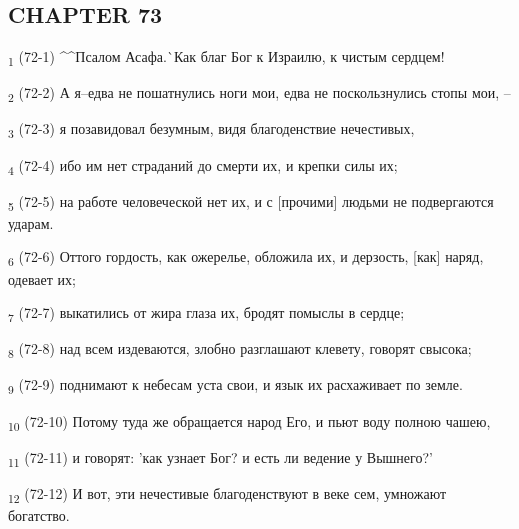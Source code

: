 \subsection{CHAPTER 73}
\begin{tcolorbox}
\textsubscript{1} (72-1) ^^Псалом Асафа.^^ Как благ Бог к Израилю, к чистым сердцем!
\end{tcolorbox}
\begin{tcolorbox}
\textsubscript{2} (72-2) А я--едва не пошатнулись ноги мои, едва не поскользнулись стопы мои, --
\end{tcolorbox}
\begin{tcolorbox}
\textsubscript{3} (72-3) я позавидовал безумным, видя благоденствие нечестивых,
\end{tcolorbox}
\begin{tcolorbox}
\textsubscript{4} (72-4) ибо им нет страданий до смерти их, и крепки силы их;
\end{tcolorbox}
\begin{tcolorbox}
\textsubscript{5} (72-5) на работе человеческой нет их, и с [прочими] людьми не подвергаются ударам.
\end{tcolorbox}
\begin{tcolorbox}
\textsubscript{6} (72-6) Оттого гордость, как ожерелье, обложила их, и дерзость, [как] наряд, одевает их;
\end{tcolorbox}
\begin{tcolorbox}
\textsubscript{7} (72-7) выкатились от жира глаза их, бродят помыслы в сердце;
\end{tcolorbox}
\begin{tcolorbox}
\textsubscript{8} (72-8) над всем издеваются, злобно разглашают клевету, говорят свысока;
\end{tcolorbox}
\begin{tcolorbox}
\textsubscript{9} (72-9) поднимают к небесам уста свои, и язык их расхаживает по земле.
\end{tcolorbox}
\begin{tcolorbox}
\textsubscript{10} (72-10) Потому туда же обращается народ Его, и пьют воду полною чашею,
\end{tcolorbox}
\begin{tcolorbox}
\textsubscript{11} (72-11) и говорят: 'как узнает Бог? и есть ли ведение у Вышнего?'
\end{tcolorbox}
\begin{tcolorbox}
\textsubscript{12} (72-12) И вот, эти нечестивые благоденствуют в веке сем, умножают богатство.
\end{tcolorbox}
